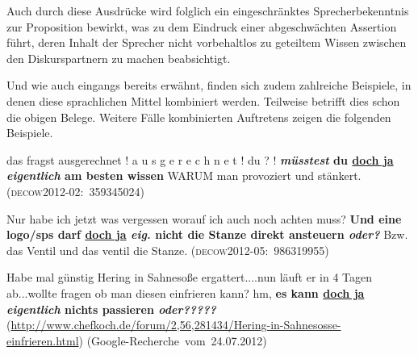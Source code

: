 Auch durch diese Ausdrücke wird folglich ein eingeschränktes Sprecherbekenntnis zur Proposition bewirkt, was zu dem Eindruck einer abgeschwächten Assertion führt, deren Inhalt der Sprecher nicht vorbehaltlos zu geteiltem Wissen zwischen den Diskurspartnern zu machen beabsichtigt.

Und wie auch eingangs bereits erwähnt, finden sich zudem zahlreiche Beispiele, in denen diese sprachlichen Mittel kombiniert werden. Teilweise betrifft dies schon die obigen Belege. Weitere Fälle kombinierten Auftretens zeigen die folgenden Beispiele.

\begin{exe}
	\ex\label{502} 

	das fragst ausgerechnet ! a u s g e r e c h n e t ! du ? ! \textbf{\textit{müsstest} du \underline{doch ja} \textit{eigentlich} am besten wissen} 			WARUM man provoziert und stänkert.		 		 
	\hfill\hbox{\scshape(decow2012-02: 359345024)}	
\end{exe}

\begin{exe}
	\ex\label{503} 

	Nur habe ich jetzt was vergessen worauf ich auch noch achten muss? \textbf{Und eine logo/sps darf \underline{doch ja} \textit{eig.} nicht die Stanze 		direkt ansteuern \textit{oder?}} Bzw. das Ventil und das ventil die Stanze.		 		 
	\hfill\hbox{\scshape(decow2012-05: 986319955)}	
\end{exe}
			              
\begin{exe}
	\ex\label{504} 

	Habe mal günstig Hering in Sahnesoße ergattert....nun läuft er in 4 Tagen ab...wollte fragen ob man diesen einfrieren kann?
	hm, \textbf{es kann \underline{doch ja} \textit{eigentlich} nichts passieren \textit{oder?????}} 
	\newline
	{\scriptsize(\url{http://www.chefkoch.de/forum/2,56,281434/Hering-in-Sahnesosse-einfrieren.html})}
	\newline
	\hbox{}\hfill\hbox{(Google-Recherche vom 24.07.2012)}
\end{exe}	

